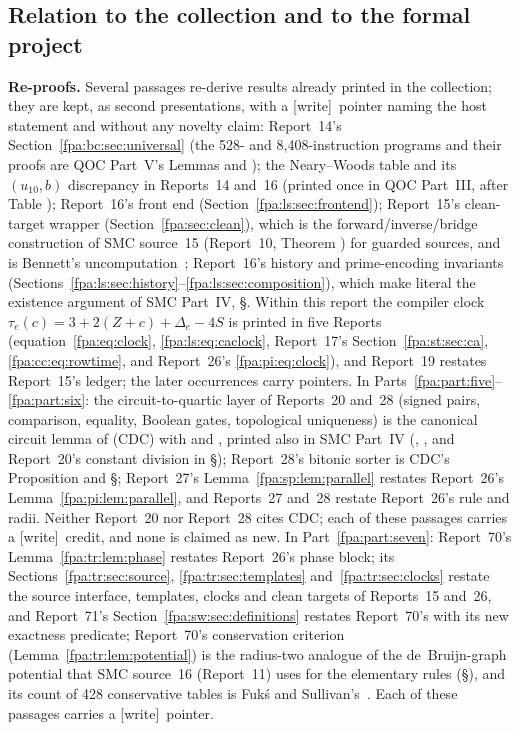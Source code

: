 \documentclass[11pt,a4paper]{article}
\numberwithin{equation}{section}
\newcommand{\wtag}{\textup{[write]}}
\begin{document}
\subsection{Relation to the collection and to the formal project}\label{fpa:sec:relation}
\textbf{Re-proofs.} Several passages re-derive results already printed in the collection; they are kept, as second presentations, with a \wtag\ pointer naming the host statement and without any novelty claim: Report~14's Section~\ref{fpa:bc:sec:universal} (the 528- and 8,408-instruction programs and their proofs are QOC Part~V's Lemmas  and ); the Neary--Woods table and its $(u_{10},b)$ discrepancy in Reports~14 and~16 (printed once in QOC Part~III, after Table ); Report~16's front end (Section~\ref{fpa:ls:sec:frontend}); Report~15's clean-target wrapper (Section~\ref{fpa:sec:clean}), which is the forward/inverse/bridge construction of SMC source~15 (Report~10, Theorem ) for guarded sources, and is Bennett's uncomputation~\cite{fpa:bennett}; Report~16's history and prime-encoding invariants (Sections~\ref{fpa:ls:sec:history}--\ref{fpa:ls:sec:composition}), which make literal the existence argument of SMC Part~IV, \S{}. Within this report the compiler clock $\tau_e(c)=3+2(Z+c)+\Delta_e-4S$ is printed in five Reports (equation~\eqref{fpa:eq:clock}, \eqref{fpa:ls:eq:caclock}, Report~17's Section~\ref{fpa:st:sec:ca}, \eqref{fpa:cc:eq:rowtime}, and Report~26's \eqref{fpa:pi:eq:clock}), and Report~19 restates Report~15's ledger; the later occurrences carry pointers. In Parts~\ref{fpa:part:five}--\ref{fpa:part:six}: the circuit-to-quartic layer of Reports~20 and~28 (signed pairs, comparison, equality, Boolean gates, topological uniqueness) is the canonical circuit lemma  of  (CDC) with  and , printed also in SMC Part~IV (, , and Report~20's constant division in \S{}); Report~28's bitonic sorter is CDC's Proposition  and \S{}; Report~27's Lemma~\ref{fpa:sp:lem:parallel} restates Report~26's Lemma~\ref{fpa:pi:lem:parallel}, and Reports~27 and~28 restate Report~26's rule and radii. Neither Report~20 nor Report~28 cites CDC; each of these passages carries a \wtag\ credit, and none is claimed as new. In Part~\ref{fpa:part:seven}: Report~70's Lemma~\ref{fpa:tr:lem:phase} restates Report~26's phase block; its Sections~\ref{fpa:tr:sec:source}, \ref{fpa:tr:sec:templates} and~\ref{fpa:tr:sec:clocks} restate the source interface, templates, clocks and clean targets of Reports~15 and~26, and Report~71's Section~\ref{fpa:sw:sec:definitions} restates Report~70's with its new exactness predicate; Report~70's conservation criterion (Lemma~\ref{fpa:tr:lem:potential}) is the radius-two analogue of the de~Bruijn-graph potential that SMC source~16 (Report~11) uses for the elementary rules (\S{}), and its count of 428 conservative tables is Fuk\'s and Sullivan's~\cite{fpa:tr:fuks}. Each of these passages carries a \wtag\ pointer.
\end{document}
